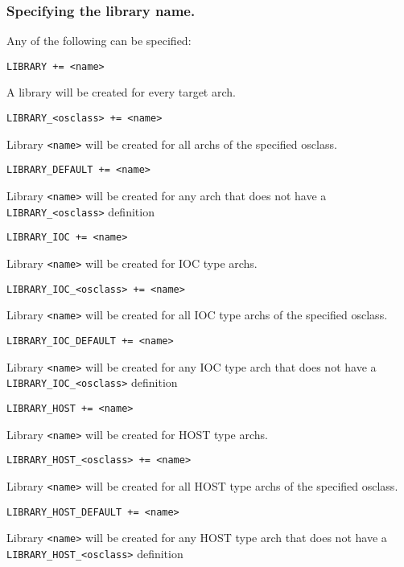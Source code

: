 \subsubsection{Specifying the library name.}

Any of the following can be specified:

\begin{description}

\item {}\verb|LIBRARY += <name>|

A library will be created for every target arch.

\item \verb|LIBRARY_<osclass> += <name>|

Library \verb|<name>| will be created for all archs of the specified osclass.

\item \verb|LIBRARY_DEFAULT += <name>|

Library \verb|<name>| will be created for any arch that does not have a \verb|LIBRARY_<osclass>| definition

\item {}\verb|LIBRARY_IOC += <name>|

Library \verb|<name>| will be created for IOC type archs.

\item \verb|LIBRARY_IOC_<osclass> += <name>|

Library \verb|<name>| will be created for all IOC type archs of the specified osclass.

\item \verb|LIBRARY_IOC_DEFAULT += <name>|

Library \verb|<name>| will be created for any IOC type arch that does not have a \verb|LIBRARY_IOC_<osclass>| 
definition

\item {}\verb|LIBRARY_HOST += <name>|

Library \verb|<name>| will be created for HOST type archs.

\item \verb|LIBRARY_HOST_<osclass> += <name>|

Library \verb|<name>| will be created for all HOST type archs of the specified osclass.

\item \verb|LIBRARY_HOST_DEFAULT += <name>|

Library \verb|<name>| will be created for any HOST type arch that does not have a \verb|LIBRARY_HOST_<osclass>| 
definition

\end{description}

